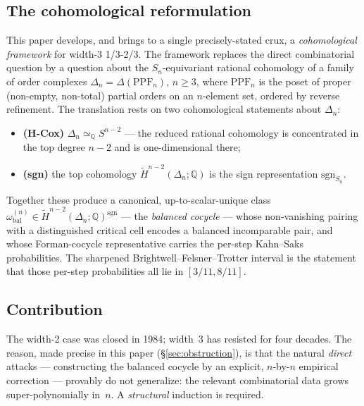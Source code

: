 \documentclass[11pt,reqno]{amsart}
\theoremstyle{plain}
\theoremstyle{definition}
\newcommand{\PPF}{\mathrm{PPF}}
\newcommand{\Hred}{\widetilde H}
\newcommand{\sgn}{\mathrm{sgn}}
\newcommand{\Q}{\mathbb{Q}}
\newcommand{\omegabal}[1]{\omega_{\mathrm{bal}}^{(#1)}}
\begin{document}
\subsection{The cohomological reformulation}
This paper develops, and brings to a single precisely-stated crux, a
\emph{cohomological framework} for width-3 1/3-2/3. The framework
replaces the direct combinatorial question by a question about the
$S_n$-equivariant rational cohomology of a family of order complexes
$\Delta_n=\Delta(\PPF_n)$, $n\ge3$, where $\PPF_n$ is the poset of
proper (non-empty, non-total) partial orders on an $n$-element set,
ordered by reverse refinement. The translation rests on two cohomological
statements about $\Delta_n$:
\begin{itemize}[leftmargin=1.6em]
  \item \textbf{(H-Cox)} $\Delta_n\simeq_{\Q}S^{n-2}$ --- the reduced
        rational cohomology is concentrated in the top degree $n-2$ and
        is one-dimensional there;
  \item \textbf{(sgn)} the top cohomology
        $\Hred^{n-2}(\Delta_n;\Q)$ is the sign representation
        $\sgn_{S_n}$.
\end{itemize}
Together these produce a canonical, up-to-scalar-unique class
$\omegabal{n}\in\Hred^{n-2}(\Delta_n;\Q)^{\sgn}$ --- the
\emph{balanced cocycle} --- whose non-vanishing pairing with a
distinguished critical cell encodes a balanced incomparable pair, and
whose Forman-cocycle representative carries the per-step Kahn--Saks
probabilities. The sharpened Brightwell--Felsner--Trotter interval is the
statement that those per-step probabilities all lie in $[3/11,8/11]$.

\subsection{Contribution}
The width-2 case was closed in 1984; width~3 has resisted for four
decades. The reason, made precise in this paper
(\S\ref{sec:obstruction}), is that the natural \emph{direct} attacks ---
constructing the balanced cocycle by an explicit, $n$-by-$n$ empirical
correction --- provably do not generalize: the relevant combinatorial
data grows super-polynomially in~$n$. A \emph{structural} induction is
required.
\end{document}
